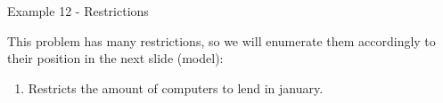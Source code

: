 \begin{frame}{Example 12 - Restrictions}

This problem has many restrictions, so we will enumerate them accordingly to
their position in the next slide (model):

\begin{enumerate}
\item Restricts the amount of computers to lend in january.

\end{enumerate}

\end{frame}
